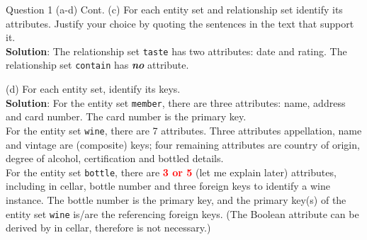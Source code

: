 \begin{frame}[fragile]{Question 1 (a-d) Cont.}
(c) For each entity set and relationship set identify its attributes. Justify your choice by quoting the sentences in the text that support it.\\ \vspace{5pt}
\textbf{Solution}: The relationship set \texttt{taste} has two attributes: date and rating. The relationship set \texttt{contain} has \textbf{\textit{no}} attribute. \\ \vspace{10pt}
	
(d) For each entity set, identify its keys.\\ \vspace{5pt}
\textbf{Solution}: For the entity set \texttt{member}, there are three attributes: name, address and card number. The card number is the primary key.\\\vspace{3pt}
For the entity set \texttt{wine}, there are 7 attributes. Three attributes appellation, name and vintage are (composite) keys; four remaining attributes are country of origin, degree of alcohol, certification and bottled details.\\\vspace{3pt}
For the entity set \texttt{bottle}, there are \textcolor{red}{\textbf{3 or 5}} (let me explain later) attributes, including in cellar, bottle number and three foreign keys to identify a wine instance. The bottle number is the primary key, and the primary key(s) of the entity set \texttt{wine} is/are the referencing foreign keys. (The Boolean attribute can be derived by in cellar, therefore is not necessary.)
\end{frame}

